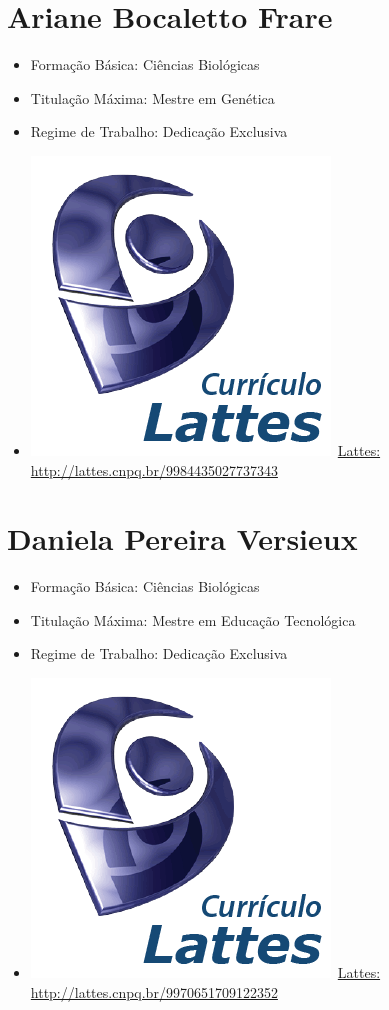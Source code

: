 \documentclass[11pt,fleqn]{book} %
\begin{document}
\section{Ariane Bocaletto Frare}\label{ArianeFrare}
\begin{itemize}
	\item Formação Básica: Ciências Biológicas
	\item Titulação Máxima: Mestre em Genética
	\item Regime de Trabalho: Dedicação Exclusiva
	\item \includegraphics[scale=.03]{Pictures/lattes}~\href{http://lattes.cnpq.br/9984435027737343}{Lattes: http://lattes.cnpq.br/9984435027737343}
\end{itemize}


\section{Daniela Pereira Versieux}\label{DanielaVersieux}
\begin{itemize}
	\item Formação Básica: Ciências Biológicas
	\item Titulação Máxima: Mestre em Educação Tecnológica
	\item Regime de Trabalho: Dedicação Exclusiva
	\item \includegraphics[scale=.03]{Pictures/lattes}~\href{http://lattes.cnpq.br/9970651709122352}{Lattes: http://lattes.cnpq.br/9970651709122352}
\end{itemize}
\end{document}
